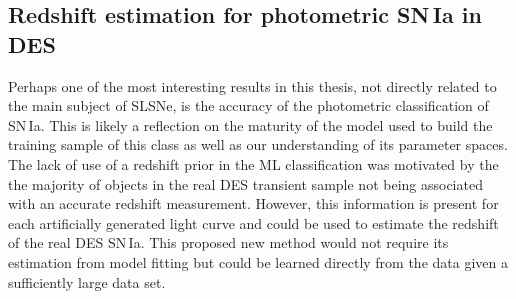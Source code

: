 \subsection{Redshift estimation for photometric SN\,Ia in DES}
Perhaps one of the most interesting results in this thesis, not directly related to the main subject of SLSNe, is the accuracy of the photometric classification of SN\,Ia. This is likely a reflection on the maturity of the model used to build the training sample of this class as well as our understanding of its parameter spaces. The lack of use of a redshift prior in the ML classification was motivated by the the majority of objects in the real DES transient sample not being associated with an accurate redshift measurement. However, this information is present for each artificially generated light curve and could be used to estimate the redshift of the real DES SN\,Ia. This proposed new method would not require its estimation from model fitting but could be learned directly from the data given a sufficiently large data set.
